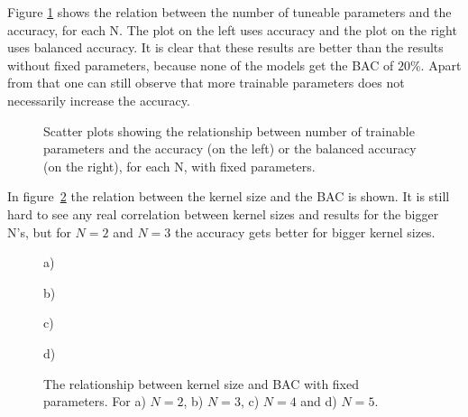 Figure \ref{fig:scatter_fixed} shows the relation between the number of tuneable parameters and the accuracy, for each N. The plot on the left uses accuracy and the plot on the right uses balanced accuracy. It is clear that these results are better than the results without fixed parameters, because none of the models get the BAC of $20\%$. Apart from that one can still observe that more trainable parameters does not necessarily increase the accuracy.

\begin{figure}[H]
    \centering
    \begin{minipage}[b]{0.49\textwidth}
        
        \vspace{-0.5cm}
    \end{minipage}
    \begin{minipage}[b]{0.49\textwidth}
        
        \vspace{-0.5cm}
    \end{minipage}
    \captionsetup{width=0.95\linewidth}
    \caption{Scatter plots showing the relationship between number of trainable parameters and the accuracy (on the left) or the balanced accuracy (on the right), for each N, with fixed parameters.}
    \label{fig:scatter_fixed}
\end{figure}

In figure~\ref{fig:kernel_acc} the relation between the kernel size and the BAC is shown. It is still hard to see any real correlation between kernel sizes and results for the bigger N's, but for $N=2$ and $N=3$ the accuracy gets better for bigger kernel sizes.


\begin{figure}[H]
    \centering
    \begin{minipage}[b]{0.42\textwidth}
        
        \vspace{-0.5cm}
        \caption*{a)}
    \end{minipage}
    \begin{minipage}[b]{0.42\textwidth}
        
        \vspace{-0.5cm}
        \caption*{b)}
    \end{minipage}
    \begin{minipage}[b]{0.42\textwidth}
        
        \vspace{-0.5cm}
        \caption*{c)}
    \end{minipage}
    \begin{minipage}[b]{0.42\textwidth}
        
        \vspace{-0.5cm}
        \caption*{d)}
    \end{minipage}
    \captionsetup{width=0.95\linewidth}
    \caption{The relationship between kernel size and BAC with fixed parameters. For a) $N=2$, b) $N=3$, c) $N=4$ and d) $N=5$.}
    \label{fig:kernel_acc}
\end{figure}


